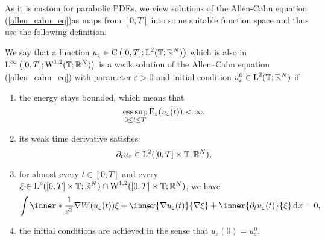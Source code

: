 As it is custom for parabolic PDEs, we view solutions of the Allen-Cahn equation (\ref{allen_cahn_eq})as maps from $ [0,T] $ into some suitable function space and thus use the following definition.

\begin{definition}
	\label{solution_to_ac}
	We say that a function 
	$ u_{ \varepsilon} \in 
	\mathrm{ C } \left( [0 , T ] ; \operatorname{L}^{ 2 } ( \operatorname{\mathbb{T}}; \mathbb{ R }^{ N } ) \right) $
	which is also in
	$\operatorname{L}^{ \infty } \left( [0, T ]; \operatorname{W}^{ 1, 2 } ( \operatorname{\mathbb{T}} ; \mathbb{ R }^{ N } ) \right)
	$
	is a weak solution of the Allen--Cahn equation (\ref{allen_cahn_eq}) with parameter $ \varepsilon > 0 $ and initial condition $ u_{ \varepsilon}^{ 0 } \in \operatorname{L}^{ 2 } ( \operatorname{\mathbb{T}} ; \mathbb{ R }^{ N } ) $ if
	\begin{enumerate}
		\item the energy stays bounded, which means that
		\begin{equation}
			\operatorname*{ess\,sup}_{ 0 \leq t \leq T }
				\operatorname{E}_{ \varepsilon } ( u_{ \varepsilon } ( t ) ) 
			< \infty,
		\end{equation}
		\item 
		its weak time derivative satisfies
		\begin{equation}
			\partial_{ t } u_{ \varepsilon }
			\in
			\operatorname{L}^{ 2 } ( [ 0 , T ] \times \operatorname{\mathbb{T}} ; \mathbb{ R }^{ N } ),
		\end{equation}
		\item 
		for almost every $ t \in [ 0 , T ] $ and every 
		$ \xi \in \operatorname{L}^{ p } ( [ 0 , T ] \times \operatorname{\mathbb{T}}; \mathbb{ R }^{ N } ) 
		\cap
		\operatorname{W}^{ 1, 2 } ( [ 0, T ] \times \operatorname{\mathbb{T}} ; \mathbb{ R }^{ N } ) $,
		we have
		\begin{equation}
			\label{ac_weak_equation}
			\int
				\inner*{ \frac{ 1 }{ \varepsilon^{ 2 } } \nabla W ( u_{ \varepsilon} ( t ) ) }{ \xi }
				+
				\inner{ \nabla u_{ \varepsilon } ( t ) }{ \nabla \xi } 
				+
				\inner{\partial_{ t } u_{ \varepsilon} ( t ) }{ \xi }
			\dd{x}
			=
			0,
		\end{equation}
		\item 
		the initial conditions are achieved in the sense that $ u_{ \varepsilon } ( 0 ) = u_{ \varepsilon}^{ 0 } $.
	\end{enumerate}
\end{definition}

